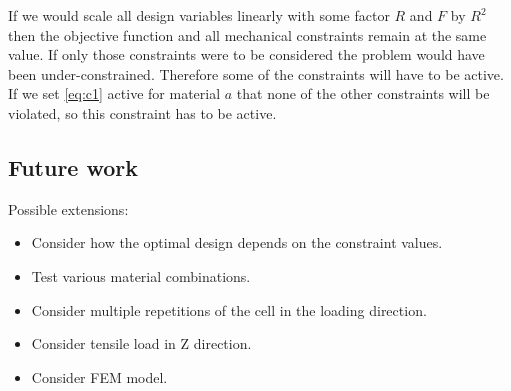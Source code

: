 If we would scale all design variables linearly with some factor $R$ and $F$ by $R^2$ then the objective function and all mechanical constraints  remain at the same value.
If only those constraints were to be considered the problem would have been under-constrained.
Therefore some of the constraints  will have to be active.
If we set \cref{eq:c1} active for material $a$  that none of the other constraints will be violated, so this constraint has to be active.



\subsection{Future work}
Possible extensions:
\begin{itemize}
	\item Consider how the optimal design depends on the constraint values.
	\item Test various material combinations.
	\item Consider multiple repetitions of the cell in the loading direction.
	\item Consider tensile load in Z direction.
	\item Consider FEM model.
\end{itemize}

